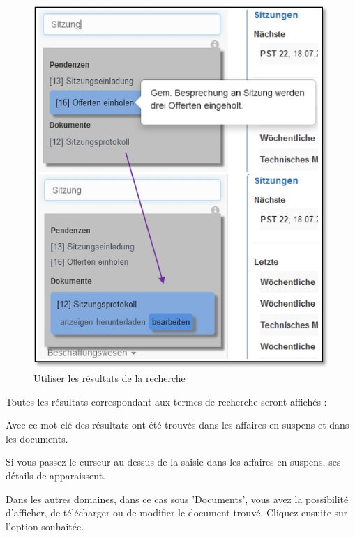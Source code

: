 \begin{figure}   %
  \vspace{-30pt}      %
  \begin{center}
    \includegraphics[width=0.8\linewidth]{../chapters/02_GettingStarted/pictures/2-5-1_Such_Ergebnisse.jpg}
  \end{center}
  \vspace{-20pt}
  \caption{Utiliser les résultats de la recherche}
  \vspace{-10pt}
\end{figure}

Toutes les résultats correspondant aux termes de recherche seront affichés :

\begin{compactitem}
	\item Avec ce mot-clé des résultats ont été trouvés dans les affaires en suspens et dans les documents.
	\item Si vous passez le curseur au dessus de la saisie dans les affaires en suspens, ses détails de apparaissent.
	\item Dans les autres domaines, dans ce cas sous 'Documents', vous avez la possibilité d'afficher, de télécharger ou de modifier le document trouvé. Cliquez ensuite sur l'option souhaitée.
\end{compactitem}

